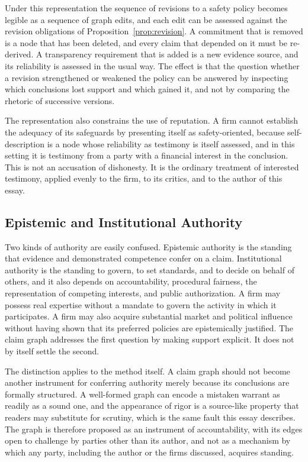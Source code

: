\documentclass[12pt]{article}
\theoremstyle{definition}
\theoremstyle{remark}
\begin{document}
Under this representation the sequence of revisions to a safety policy becomes legible as a sequence of graph edits, and each edit can be assessed against the revision obligations of Proposition~\ref{prop:revision}. A commitment that is removed is a node that has been deleted, and every claim that depended on it must be re-derived. A transparency requirement that is added is a new evidence source, and its reliability is assessed in the usual way. The effect is that the question whether a revision strengthened or weakened the policy can be answered by inspecting which conclusions lost support and which gained it, and not by comparing the rhetoric of successive versions.

The representation also constrains the use of reputation. A firm cannot establish the adequacy of its safeguards by presenting itself as safety-oriented, because self-description is a node whose reliability as testimony is itself assessed, and in this setting it is testimony from a party with a financial interest in the conclusion. This is not an accusation of dishonesty. It is the ordinary treatment of interested testimony, applied evenly to the firm, to its critics, and to the author of this essay.

\subsection{Epistemic and Institutional Authority}

Two kinds of authority are easily confused. Epistemic authority is the standing that evidence and demonstrated competence confer on a claim. Institutional authority is the standing to govern, to set standards, and to decide on behalf of others, and it also depends on accountability, procedural fairness, the representation of competing interests, and public authorization. A firm may possess real expertise without a mandate to govern the activity in which it participates. A firm may also acquire substantial market and political influence without having shown that its preferred policies are epistemically justified. The claim graph addresses the first question by making support explicit. It does not by itself settle the second.

The distinction applies to the method itself. A claim graph should not become another instrument for conferring authority merely because its conclusions are formally structured. A well-formed graph can encode a mistaken warrant as readily as a sound one, and the appearance of rigor is a source-like property that readers may substitute for scrutiny, which is the same fault this essay describes. The graph is therefore proposed as an instrument of accountability, with its edges open to challenge by parties other than its author, and not as a mechanism by which any party, including the author or the firms discussed, acquires standing.
\end{document}

